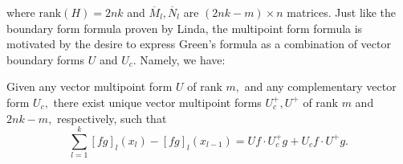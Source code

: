 \documentclass[10pt,reqno,oneside,a4paper]{article}
\begin{document}
where $\mathrm{rank}(H) = 2nk$ and $\overline{M}_l, \overline{N}_l$ are $(2nk-m) \times n$ matrices. Just like the boundary form formula proven by Linda, the multipoint form formula is motivated by the desire to express Green's formula as a combination of vector boundary forms $U$ and $U_c.$ Namely, we have:

\begin{thm}\label{P2.BFF-theorem}
Given any vector multipoint form $U$ of rank $m,$ and any complementary vector form $U_c,$ there exist unique vector multipoint forms $U^+_c, U^+$ of rank $m$ and $2nk-m,$ respectively, such that
\begin{equation}\label{P2.BFF-eqn}
\sum_{l=1}^{k} [fg]_l(x_l) - [fg]_l(x_{l-1}) = Uf\cdot U^+_c g + U_c f \cdot U^+ g.
\end{equation}
\end{thm}
\end{document}
